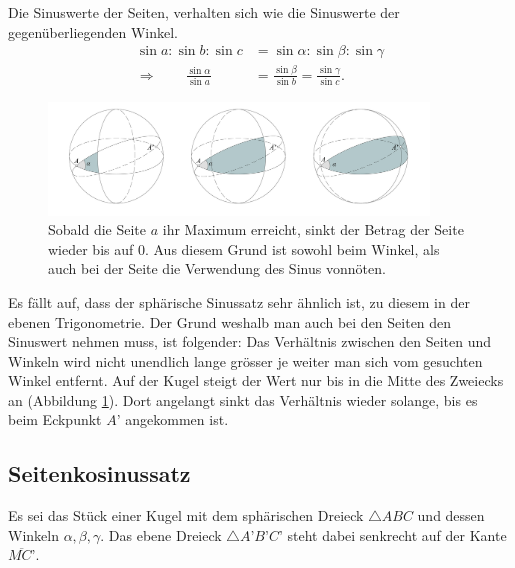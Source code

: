 \begin{refsection}
\begin{satz}
Die Sinuswerte der Seiten, verhalten sich wie die Sinuswerte der gegenüberliegenden Winkel.
\begin{align*}
\sin a : \sin b : \sin c &= \sin \alpha : \sin \beta : \sin \gamma \\
\Rightarrow \quad \quad
\frac{\sin \alpha} {\sin a} &= \frac{\sin \beta} {\sin b} = \frac{\sin \gamma} {\sin c}.
\end{align*} 
\label{skript:kugel:satz:Sinussatz}
\end{satz}

\begin{figure}[htbp]
\centering
\includegraphics[width=0.9\textwidth]{kugel/SinussatzB.jpg}
\caption{Sobald die Seite $a$ ihr Maximum erreicht, sinkt der Betrag der Seite wieder bis auf 0. Aus diesem Grund ist sowohl beim Winkel, als auch bei der Seite die Verwendung des Sinus vonnöten.}
\label{Beweissinus}
\end{figure}

Es fällt auf, dass der sphärische Sinussatz sehr ähnlich ist, zu diesem in der ebenen Trigonometrie.
Der Grund weshalb man auch bei den Seiten den Sinuswert nehmen muss, ist folgender:
Das Verhältnis zwischen den Seiten und Winkeln wird nicht unendlich lange grösser je weiter man sich vom gesuchten Winkel entfernt. Auf der Kugel steigt der Wert nur bis in die Mitte des Zweiecks an (Abbildung \ref{Beweissinus}). Dort angelangt sinkt das Verhältnis wieder solange, bis es beim Eckpunkt $A’$ angekommen ist.


\subsection{Seitenkosinussatz}
Es sei das Stück einer Kugel mit dem sphärischen Dreieck $\triangle{ABC}$ und dessen Winkeln $\alpha, \beta, \gamma$. Das ebene Dreieck $\triangle{A’B’C’}$ steht dabei senkrecht auf der Kante $\overline{MC’}$.


\end{refsection}
